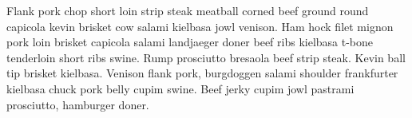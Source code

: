 \documentclass[a4paper]{article}
\begin{document}
Flank pork chop short loin strip steak meatball corned beef ground round capicola kevin brisket cow salami kielbasa jowl venison. Ham hock filet mignon pork loin brisket capicola salami landjaeger doner beef ribs kielbasa t-bone tenderloin short ribs swine. Rump prosciutto bresaola beef strip steak. Kevin ball tip brisket kielbasa. Venison flank pork, burgdoggen salami shoulder frankfurter kielbasa chuck pork belly cupim swine. Beef jerky cupim jowl pastrami prosciutto, hamburger doner.
\end{document}
